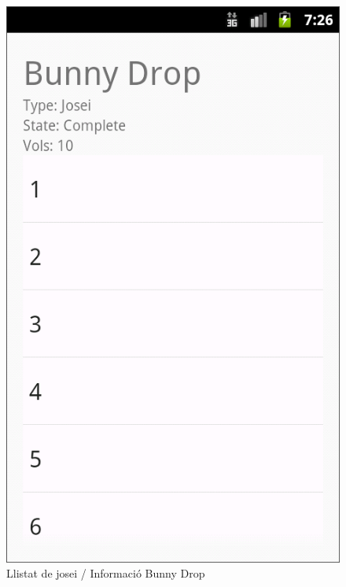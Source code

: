 \documentclass{beamer}
\begin{document}
\begin{frame}
\begin{figure}
			\includegraphics[scale=0.23]{serie.png}
			\caption{Llistat de josei / Informació Bunny Drop}	
		\end{figure}
	\end{frame}
\end{document}
